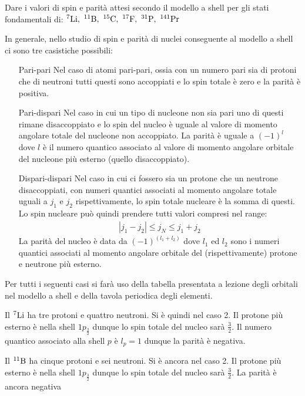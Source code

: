 \documentclass[../main.tex]{subfiles}
\begin{document}
	\begin{ese}[7.1]
		Dare i valori di spin e parità attesi secondo il modello a shell per gli stati fondamentali di: $ ^{7}\chem{Li},\ ^{11}\chem{B},\ ^{15}\chem{C},\ ^{17}\chem{F},\ ^{31}\chem{P},\ ^{141}\chem{Pr} $
	\end{ese}
	\begin{svol}
		In generale, nello studio di spin e parità di nuclei conseguente al modello a shell ci sono tre casistiche possibili:
		\begin{enumerate}
			\item[Pari-pari] Nel caso di atomi pari-pari, ossia con un numero pari sia di protoni che di neutroni tutti questi sono accoppiati e lo spin totale è zero e la parità è positiva.
			\item[Pari-dispari] Nel caso in cui un tipo di nucleone non sia pari uno di questi rimane disaccoppiato e lo spin del nucleo è uguale al valore di momento angolare totale del nucleone non accoppiato. La parità è uguale a $ (-1)^{l} $ dove $ l $ è il numero quantico associato al valore di momento angolare orbitale del nucleone più esterno (quello disaccoppiato).
			\item[Dispari-dispari] Nel caso in cui ci fossero sia un protone che un neutrone disaccoppiati, con numeri quantici associati al momento angolare totale uguali a $ j_{1} $ e $ j_{2} $ rispettivamente, lo spin totale nucleare è la somma di questi. Lo spin nucleare può quindi prendere tutti valori compresi nel range:
			\begin{gather*}
			\left|j_{1}-j_{2}\right|\leq j_{N}\leq j_{1}+j_{2}
			\end{gather*}
			La parità del nucleo è data da $ (-1)^{(l_{1}+l_{2})} $ dove $ l_{1} $ ed $ l_{2} $ sono i numeri quantici associati al momento angolare orbitale del (rispettivamente) protone e neutrone più esterno.
		\end{enumerate}
		Per tutti i seguenti casi si farà uso della tabella presentata a lezione degli orbitali nel modello a shell e della tavola periodica degli elementi.
		
		Il $ ^{7}\mathrm{Li} $ ha tre protoni e quattro neutroni. Si è quindi nel caso 2. Il protone più esterno è nella shell $ 1p_{\frac{3}{2}} $ dunque lo spin totale del nucleo sarà $ \frac{3}{2} $. Il numero quantico associato alla shell $ p $ è $ l_{p}=1 $ dunque la parità è negativa.
		
		Il $ ^{11}\mathrm{B} $ ha cinque protoni e sei neutroni. Si è ancora nel caso 2. Il protone più esterno è nella shell $ 1p_{\frac{3}{2}} $ dunque lo spin totale del nucleo sarà $ \frac{3}{2} $. La parità è ancora negativa


\end{svol}
\end{document}
